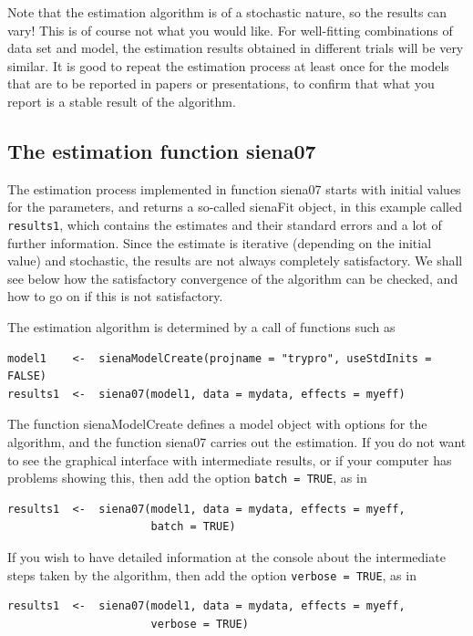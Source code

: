 \documentclass[a4paper,fleqn,11pt]{article}
\newcommand{\+}{\, + \,}
\begin{document}
{Note that the estimation algorithm is of a stochastic nature, so
the results can vary! This is of course not what you would like.
For well-fitting combinations of data set and model, the
estimation results obtained in different trials will be very
similar. It is good to repeat the estimation process at least once
for the models that are to be reported in papers or presentations,
to confirm that what you report is a stable result of the
algorithm.

\subsection{The estimation function \textsf{siena07}}
\hypertarget{T_S_options}{   }

The estimation process implemented in function \textsf{siena07}
starts with initial values for the parameters,
and returns a so-called \textsf{sienaFit} object, in this example called
\texttt{results1}, which contains the estimates and their standard errors and
a lot of further information.
Since the estimate is iterative (depending on the initial value) and stochastic,
the results are not always completely satisfactory. We shall see below
how the satisfactory convergence of the algorithm can be checked,
and how to go on if this is not satisfactory.

The estimation algorithm is determined by a call of functions
such as
\begin{verbatim}
model1    <-  sienaModelCreate(projname = "trypro", useStdInits = FALSE)
results1  <-  siena07(model1, data = mydata, effects = myeff)
\end{verbatim}
The function \textsf{sienaModelCreate} defines a model object with
options for the algorithm, and the function  \textsf{siena07}
carries out the estimation.
If you do not want to see the graphical interface with intermediate
results, or if your computer has problems showing this, then add
the option \texttt{batch = TRUE}, as in
\begin{verbatim}
results1  <-  siena07(model1, data = mydata, effects = myeff,
                      batch = TRUE)
\end{verbatim}
If you wish to have detailed information at the console about the intermediate
steps taken by the algorithm, then add
the option \texttt{verbose = TRUE}, as in
\begin{verbatim}
results1  <-  siena07(model1, data = mydata, effects = myeff,
                      verbose = TRUE)
\end{verbatim}


}
\end{document}
